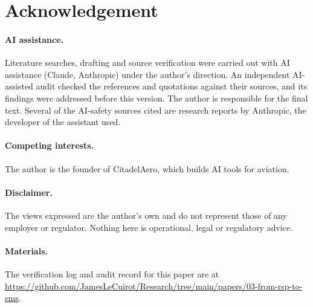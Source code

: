\documentclass[11pt]{article}
\begin{document}
\section*{Acknowledgement}
\paragraph{AI assistance.} Literature searches, drafting and source verification were carried out with AI assistance (Claude, Anthropic) under the author's direction. An independent AI-assisted audit checked the references and quotations against their sources, and its findings were addressed before this version. The author is responsible for the final text. Several of the AI-safety sources cited are research reports by Anthropic, the developer of the assistant used.
\paragraph{Competing interests.} The author is the founder of CitadelAero, which builds AI tools for aviation.
\paragraph{Disclaimer.} The views expressed are the author's own and do not represent those of any employer or regulator. Nothing here is operational, legal or regulatory advice.
\paragraph{Materials.} The verification log and audit record for this paper are at \url{https://github.com/JamesLeCuirot/Research/tree/main/papers/03-from-rsp-to-sms}.



\end{document}
